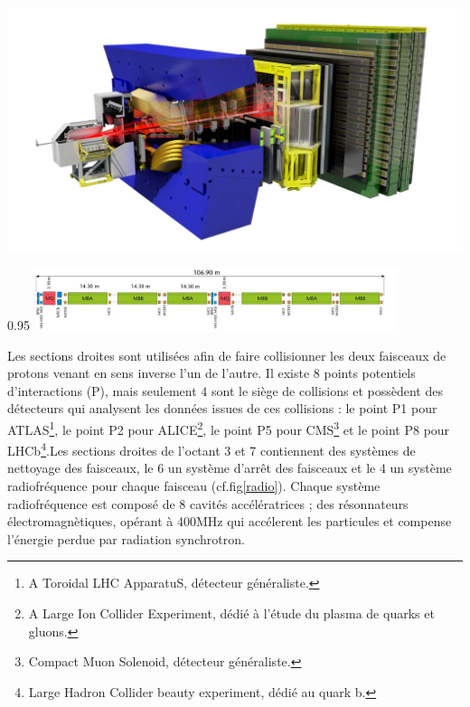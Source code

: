 \marginpar
{
	
	\includegraphics[width=\marginparwidth]{LHC/lhcb.png}
	\label{lhcb}
}
\begin{minipagewithmarginpars}[h]{0.95\textwidth}
	\centering
	\includegraphics[width=0.8\textwidth]{LHC/arc.jpg}
	\label{fodo}	
\end{minipagewithmarginpars}

Les sections droites sont utilisées afin de faire collisionner les deux faisceaux de protons venant en sens inverse l'un de l'autre. Il existe $8$ points potentiels d'interactions (P), mais seulement $4$ sont le siège de collisions et possèdent des détecteurs qui analysent les données issues de ces collisions : le point P1 pour ATLAS\footnote{A Toroidal LHC ApparatuS, détecteur généraliste.}, le point P2 pour ALICE\footnote{A Large Ion Collider Experiment, dédié à l'étude du plasma de quarks et gluons.}, le point P5 pour CMS\footnote{Compact Muon Solenoid, détecteur généraliste.} et le point P8 pour LHCb\footnote{Large Hadron Collider beauty experiment, dédié au quark b.}.Les sections droites de l'octant 3 et 7 contiennent des systèmes de nettoyage des faisceaux, le 6 un système d'arrêt des faisceaux et le 4 un système radiofréquence pour chaque faisceau (cf.fig\ref{radio}). Chaque système radiofréquence est composé de 8 cavités accélératrices ; des résonnateurs électromagnètiques, opérant à 400MHz qui accélerent les particules et compense l'énergie perdue par radiation synchrotron.

